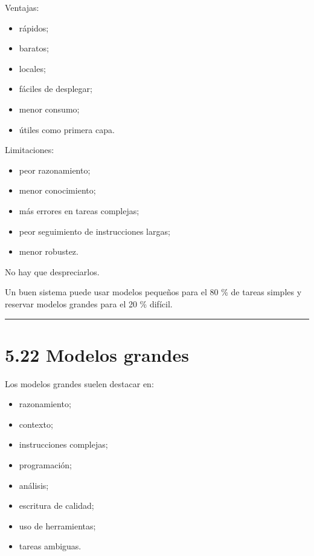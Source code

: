 Ventajas:

\begin{itemize}
\tightlist
\item
  rápidos;
\item
  baratos;
\item
  locales;
\item
  fáciles de desplegar;
\item
  menor consumo;
\item
  útiles como primera capa.
\end{itemize}

Limitaciones:

\begin{itemize}
\tightlist
\item
  peor razonamiento;
\item
  menor conocimiento;
\item
  más errores en tareas complejas;
\item
  peor seguimiento de instrucciones largas;
\item
  menor robustez.
\end{itemize}

No hay que despreciarlos.

Un buen sistema puede usar modelos pequeños para el 80 \% de tareas
simples y reservar modelos grandes para el 20 \% difícil.

\begin{center}\rule{0.5\linewidth}{0.5pt}\end{center}

\section{5.22 Modelos grandes}\label{modelos-grandes}

Los modelos grandes suelen destacar en:

\begin{itemize}
\tightlist
\item
  razonamiento;
\item
  contexto;
\item
  instrucciones complejas;
\item
  programación;
\item
  análisis;
\item
  escritura de calidad;
\item
  uso de herramientas;
\item
  tareas ambiguas.
\end{itemize}

